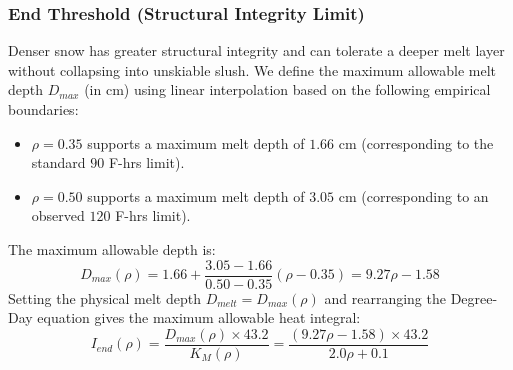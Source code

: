 \documentclass[11pt]{article}
\begin{document}
\subsubsection*{End Threshold (Structural Integrity Limit)}
Denser snow has greater structural integrity and can tolerate a deeper melt layer without collapsing into unskiable slush. We define the maximum allowable melt depth $D_{max}$ (in cm) using linear interpolation based on the following empirical boundaries:
\begin{itemize}
    \item $\rho = 0.35$ supports a maximum melt depth of $1.66$ cm (corresponding to the standard $90$ F-hrs limit).
    \item $\rho = 0.50$ supports a maximum melt depth of $3.05$ cm (corresponding to an observed $120$ F-hrs limit).
\end{itemize}
The maximum allowable depth is:
\[
D_{max}(\rho) = 1.66 + \frac{3.05 - 1.66}{0.50 - 0.35} (\rho - 0.35) = 9.27 \rho - 1.58
\]
Setting the physical melt depth $D_{melt} = D_{max}(\rho)$ and rearranging the Degree-Day equation gives the maximum allowable heat integral:
\[
I_{end}(\rho) = \frac{D_{max}(\rho) \times 43.2}{K_M(\rho)} = \frac{(9.27 \rho - 1.58) \times 43.2}{2.0\rho + 0.1}
\]
\end{document}
